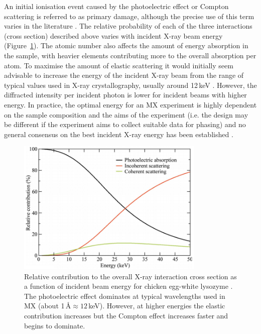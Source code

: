         An initial ionisation event caused by the photoelectric effect or Compton scattering is referred to as primary damage, although the precise use of this term varies in the literature \cite{garman2010}.
        The relative probability of each of the three interactions (cross section) described above varies with incident X-ray beam energy (Figure~\ref{fig:Relative Absorption Probabilities}).
        The atomic number also affects the amount of energy absorption in the sample, with heavier elements contributing more to the overall absorption per atom.
        To maximise the amount of elastic scattering it would initially seem advisable to increase the energy of the incident X-ray beam from the range of typical values used in X-ray crystallography, usually around 12$\,$keV \cite{pait2010}.
        However, the diffracted intensity per incident photon is lower for incident beams with higher energy.
        In practice, the optimal energy for an MX experiment is highly dependent on the sample composition and the aims of the experiment (i.e. the design may be different if the experiment aims to collect suitable data for phasing) and no general consensus on the best incident X-ray energy has been established \cite{pait2010}.
        \begin{figure}
            \centering
            \includegraphics[width=0.8\textwidth]{figures/introduction/relativeinteractions.png}
            \caption[Relative contribution to the overall X-ray interaction cross section as a function of incident beam energy for chicken egg-white lysozyme]{Relative contribution to the overall X-ray interaction cross section as a function of incident beam energy for chicken egg-white lysozyme \cite{pait2010}.
            The photoelectric effect dominates at typical wavelengths used in MX (about 1\,\AA $\approx 12$\,keV).
            However, at higher energies the elastic contribution increases but the Compton effect increases faster and begins to dominate.}
            \label{fig:Relative Absorption Probabilities}
        \end{figure}

